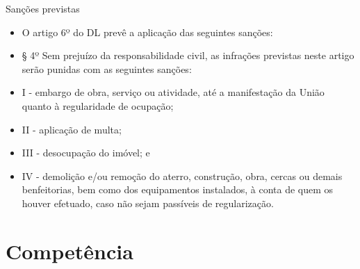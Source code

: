 \documentclass[9pt,ignorenonframetext,]{beamer}
\providecommand{\tightlist}{%
  \setlength{\itemsep}{0pt}\setlength{\parskip}{0pt}}
\begin{document}
\begin{frame}{Sanções previstas}
\protect\hypertarget{sanuxe7uxf5es-previstas}{}

\begin{itemize}[<+->]
\tightlist
\item
  \alert<1>{O artigo 6º do DL  prevê a aplicação das seguintes sanções:}
\end{itemize}

\begin{itemize}[<+->]
\tightlist
\item
  \alert<2>{§ 4º Sem prejuízo da responsabilidade civil, as infrações previstas 
  neste artigo serão punidas com as seguintes sanções:}
\end{itemize}

\begin{itemize}[<+->]
\tightlist
\item
  \alert<3>{I - embargo de obra, serviço ou atividade, até a manifestação da 
  União quanto à regularidade de ocupação;}
\end{itemize}

\begin{itemize}[<+->]
\tightlist
\item
  \alert<4>{II - aplicação de multa;}
\end{itemize}

\begin{itemize}[<+->]
\tightlist
\item
  \alert<5>{III - desocupação do imóvel; e}
\end{itemize}

\begin{itemize}[<+->]
\tightlist
\item
  \alert<6>{IV - demolição e/ou remoção do aterro, construção, obra, cercas ou 
  demais benfeitorias, bem como dos equipamentos instalados, à conta de quem os 
  houver efetuado, caso não sejam passíveis de regularização.}
\end{itemize}

\end{frame}

\hypertarget{competuxeancia}{%
\section{Competência}\label{competuxeancia}}
\end{document}
